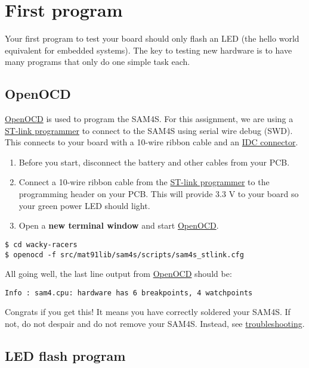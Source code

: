 \section{First program}
\label{first-program}

Your first program to test your board should only flash an LED (the
hello world equivalent for embedded systems). The key to testing new
hardware is to have many programs that only do one simple task each.

\subsection{OpenOCD}
\label{openocd}

\url{OpenOCD} is used to program the SAM4S. For this assignment, we are
using a \href{ST-link_programmer}{ST-link programmer} to connect to the
SAM4S using serial wire debug (SWD). This connects to your board with a
10-wire ribbon cable and an \href{IDC_connector}{IDC connector}.

\begin{enumerate}
\item
  Before you start, disconnect the battery and other cables from your
  PCB.
\item
  Connect a 10-wire ribbon cable from the
  \href{ST-link_programmer}{ST-link programmer} to the programming
  header on your PCB. This will provide 3.3 V to your board so your
  green power LED should light.
\item
  Open a \textbf{new terminal window} and start \url{OpenOCD}.
\end{enumerate}

\begin{verbatim}
$ cd wacky-racers
$ openocd -f src/mat91lib/sam4s/scripts/sam4s_stlink.cfg
\end{verbatim}

All going well, the last line output from \url{OpenOCD} should be:

\begin{verbatim}
Info : sam4.cpu: hardware has 6 breakpoints, 4 watchpoints
\end{verbatim}

Congrats if you get this! It means you have correctly soldered your
SAM4S. If not, do not despair and do not remove your SAM4S. Instead,
see \protect\hyperref[troubleshooting]{troubleshooting}.


\subsection{LED flash program}
\label{led-flash-program}

